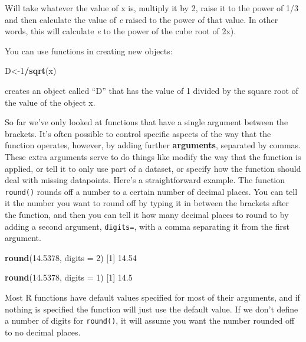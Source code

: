 \documentclass[
]{book}
\newenvironment{Shaded}{\begin{snugshade}}{\end{snugshade}}
\newcommand{\DataTypeTok}[1]{\textcolor[rgb]{0.13,0.29,0.53}{#1}}
\newcommand{\DecValTok}[1]{\textcolor[rgb]{0.00,0.00,0.81}{#1}}
\newcommand{\FloatTok}[1]{\textcolor[rgb]{0.00,0.00,0.81}{#1}}
\newcommand{\KeywordTok}[1]{\textcolor[rgb]{0.13,0.29,0.53}{\textbf{#1}}}
\newcommand{\NormalTok}[1]{#1}
\newcommand{\OperatorTok}[1]{\textcolor[rgb]{0.81,0.36,0.00}{\textbf{#1}}}
\begin{document}
Will take whatever the value of x is, multiply it by 2, raise it to the power of 1/3 and then calculate the value of \emph{e} raised to the power of that value. In other words, this will calculate \emph{e} to the power of the cube root of 2x).

You can use functions in creating new objects:

\begin{Shaded}
\begin{Highlighting}[]
\NormalTok{D<-}\DecValTok{1}\OperatorTok{/}\KeywordTok{sqrt}\NormalTok{(x)}
\end{Highlighting}
\end{Shaded}

creates an object called ``D'' that has the value of 1 divided by the square root of the value of the object x.

So far we've only looked at functions that have a single argument between the brackets. It's often possible to control specific aspects of the way that the function operates, however, by adding further \textbf{arguments}, separated by commas. These extra arguments serve to do things like modify the way that the function is applied, or tell it to only use part of a dataset, or specify how the function should deal with missing datapoints. Here's a straightforward example. The function \texttt{round()} rounds off a number to a certain number of decimal places. You can tell it the number you want to round off by typing it in between the brackets after the function, and then you can tell it how many decimal places to round to by adding a second argument, \texttt{digits=}, with a comma separating it from the first argument.

\begin{Shaded}
\begin{Highlighting}[]
\KeywordTok{round}\NormalTok{(}\FloatTok{14.5378}\NormalTok{, }\DataTypeTok{digits =} \DecValTok{2}\NormalTok{)}
\NormalTok{[}\DecValTok{1}\NormalTok{] }\FloatTok{14.54}

\KeywordTok{round}\NormalTok{(}\FloatTok{14.5378}\NormalTok{, }\DataTypeTok{digits =} \DecValTok{1}\NormalTok{)}
\NormalTok{[}\DecValTok{1}\NormalTok{] }\FloatTok{14.5}
\end{Highlighting}
\end{Shaded}

Most R functions have default values specified for most of their arguments, and if nothing is specified the function will just use the default value. If we don't define a number of digits for \texttt{round()}, it will assume you want the number rounded off to no decimal places.
\end{document}
